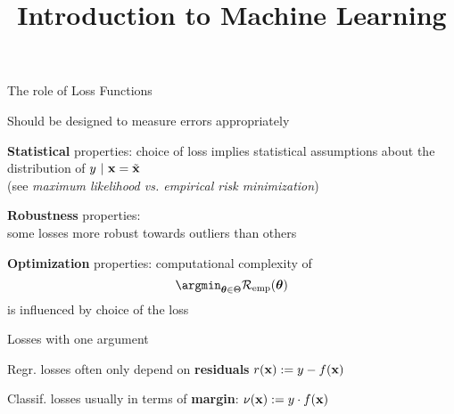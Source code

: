 \documentclass[11pt,compress,t,notes=noshow, xcolor=table]{beamer}
\title{Introduction to Machine Learning}
\begin{document}

\begin{framei}[sep=L]{The role of Loss Functions}

\item Should be designed to measure errors appropriately

\item \textbf{Statistical} properties: choice of loss implies statistical assumptions about the distribution of $y ~|~ \mathbf{x} = \tilde{\mathbf{x}}$ \\
(see \emph{maximum likelihood vs. empirical risk minimization})
\item \textbf{Robustness} properties: \\
some losses more robust towards outliers than others
\item \textbf{Optimization} properties: computational complexity of
$$
\argmint \risket
$$
is influenced by choice of the loss 

\end{framei}



\begin{framei}[sep=M]{Losses with one argument}


\item Regr. losses often only depend on  \textbf{residuals} 
$r(\mathbf{x}) := y - f(\mathbf{x})$

\item Classif. losses usually in terms of 
\textbf{margin}: $\nu(\mathbf{x})  := y \cdot f(\mathbf{x})$

\vfill


\end{framei}
\end{document}
